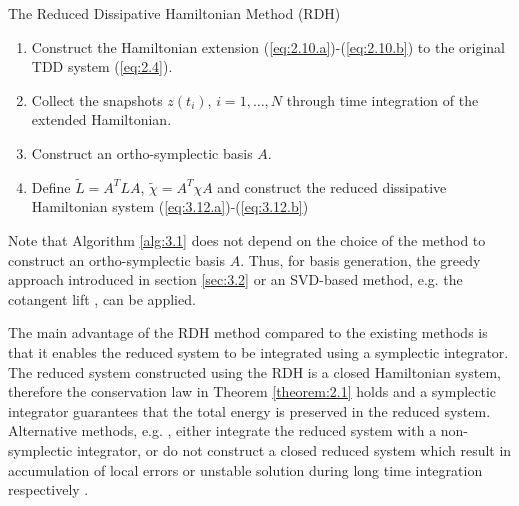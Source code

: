 \begin{algorithm}
\caption{The Reduced Dissipative Hamiltonian Method (RDH)} \label{alg:3.1}
\begin{enumerate}
	\item Construct the Hamiltonian extension (\ref{eq:2.10.a})-(\ref{eq:2.10.b}) to the original TDD system (\ref{eq:2.4}).
	\item Collect the snapshots $z(t_i)$, $i=1,\dots,N$ through time integration of the extended Hamiltonian.
	\item Construct an ortho-symplectic basis $A$.
	\item Define $\tilde L = A^T L A$, $\tilde \chi = A^T \chi A$ and construct the reduced dissipative Hamiltonian system (\ref{eq:3.12.a})-(\ref{eq:3.12.b})
\end{enumerate}
\end{algorithm}

Note that Algorithm \ref{alg:3.1} does not depend on the choice of the method to construct an ortho-symplectic basis $A$. Thus, for basis generation, the greedy approach introduced in section \ref{sec:3.2} or an SVD-based method, e.g. the cotangent lift \cite{Peng:2014di}, can be applied.

The main advantage of the RDH method compared to the existing methods is that it enables the reduced system to be integrated using a symplectic integrator. The reduced system constructed using the RDH is a closed Hamiltonian system, therefore the conservation law in Theorem \ref{theorem:2.1} holds and a symplectic integrator guarantees that the total energy is preserved in the reduced system. Alternative methods, e.g. \cite{peng2016geometric,Polyuga:2010gj,beattie2011structure}, either integrate the reduced system with a non-symplectic integrator, or do not construct a closed reduced system which result in accumulation of local errors or unstable solution during long time integration respectively \cite{Hairer:1250576}.
